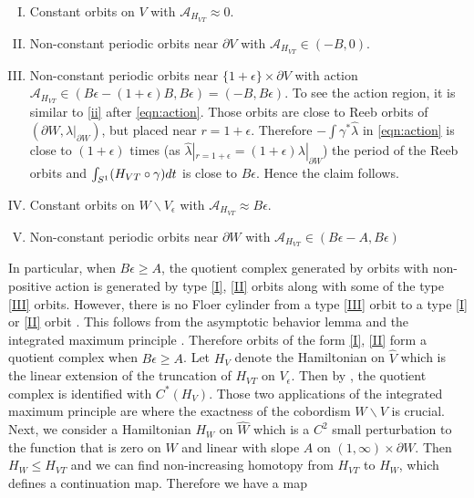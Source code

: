 \documentclass[reqno,11pt]{amsart}
\numberwithin{equation}{section}
\def\cA{{\mathcal A}}
\def\rd{{\rm d}}
\begin{document}
\begin{enumerate}[(I)]
	\item\label{I} Constant orbits on $V$ with $\cA_{H_{VT}}\approx 0$.
	\item\label{II} Non-constant periodic orbits near $\partial V$ with $\cA_{H_{VT}} \in (-B,0)$.
	\item\label{III} Non-constant periodic orbits near $\{1+\epsilon\}\times \partial V$ with action $\cA_{H_{VT}}\in (B\epsilon-(1+\epsilon)B, B\epsilon)=(-B,B\epsilon)$. To see the action region, it is similar to \eqref{ii} after \eqref{eqn:action}. Those orbits are close to Reeb orbits of $(\partial W, \lambda|_{\partial W})$, but placed near $r=1+\epsilon$. Therefore $-\int \gamma^*\widehat{\lambda}$ in \eqref{eqn:action} is close to $(1+\epsilon)$  times (as $\widehat{\lambda}|_{r=1+\epsilon}=(1+\epsilon)\lambda|_{\partial W}$) the period of the Reeb orbits and $\int_{S^1} (H_{VT}\circ \gamma) \rd t$ is close to $B\epsilon$. Hence the claim follows.
	\item\label{IV} Constant orbits on $W\backslash V_{\epsilon}$ with $\cA_{H_{VT}}\approx B\epsilon$.
	\item\label{V} Non-constant periodic orbits near $\partial W$ with $\cA_{H_{VT}}\in (B\epsilon-A, B\epsilon)$
\end{enumerate}
In particular, when $B\epsilon \ge A$, the quotient complex generated by orbits with non-positive action is generated by type \eqref{I}, \eqref{II} orbits along with some of the type \eqref{III} orbits. However, there is no Floer cylinder from a type \eqref{III} orbit to a type \eqref{I} or \eqref{II} orbit \cite[Figure 6]{cieliebak2018symplectic}. This follows from the asymptotic behavior lemma \cite[Lemma 2.3]{cieliebak2018symplectic} and the integrated maximum principle \cite[Lemma 2.2]{cieliebak2018symplectic}. Therefore orbits of the form \eqref{I}, \eqref{II} form a quotient complex when $B\epsilon\ge A$. Let $H_V$ denote the Hamiltonian on $\widehat{V}$ which is the linear extension of the truncation of $H_{VT}$ on $V_{\epsilon}$. Then by \cite[Lemma 2.2]{cieliebak2018symplectic}, the quotient complex is identified with $C^*(H_V)$. Those two applications of the integrated maximum principle are where the exactness of the cobordism $W\backslash V$ is crucial. Next, we consider a Hamiltonian $H_W$ on $\widehat{W}$ which is a $C^2$ small perturbation to the function that is zero on $W$ and linear with slope $A$ on $ (1,\infty)\times \partial W$. Then $H_W\le H_{VT}$ and we can find non-increasing homotopy from $H_{VT}$ to $H_W$, which defines a continuation map. Therefore we have a map 
\end{document}
